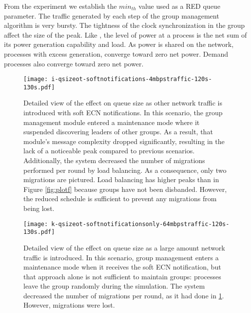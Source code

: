 From the experiment we establish the $min_{th}$ value used as a \ac{RED} queue parameter.
The traffic generated by each step of the group management algorithm is very bursty.
The tightness of the clock synchronization in the group affect the size of the peak.
Like \cite{HILTESTBED}, the level of power at a process is the net sum of its power generation capability and load.
As power is shared on the network, processes with excess generation, converge toward zero net power.
Demand processes also converge toward zero net power.

\begin{figure}
\centering
\texttt{[image: i-qsizeot-softnotifications-4mbpstraffic-120s-130s.pdf]}
\caption[Detailed view of the effect on queue size as other network traffic is introduced with soft \ac{ECN} notifications.]{
Detailed view of the effect on queue size as other network traffic is introduced with soft \ac{ECN} notifications.
In this scenario, the group management module entered a maintenance mode where it suspended discovering leaders of other groups.
As a result, that module's message complexity dropped significantly, resulting in the lack of a noticeable peak compared to previous scenarios.
Additionally, the system decreased the number of migrations performed per round by load balancing.
As a consequence, only two migrations are pictured.
Load balancing has higher peaks than in Figure \ref{fig:plotf} because groups have not been disbanded.
However, the reduced schedule is sufficient to prevent any migrations from being lost.
}
\label{fig:ploti}
\end{figure}

\begin{figure}
\centering
\texttt{[image: k-qsizeot-softnotificationsonly-64mbpstraffic-120s-130s.pdf]}
\caption[Detailed view of the effect on queue size as a large amount network traffic is introduced.]{
Detailed view of the effect on queue size as a large amount network traffic is introduced.
In this scenario, group management enters a maintenance mode when it receives the soft \ac{ECN} notification, but that approach alone is not sufficient to maintain groups: processes leave the group randomly during the simulation.
The system decreased the number of migrations per round, as it had done in \ref{fig:ploti}.
However, migrations were lost.
}
\label{fig:plotk}
\centering
\end{figure}

